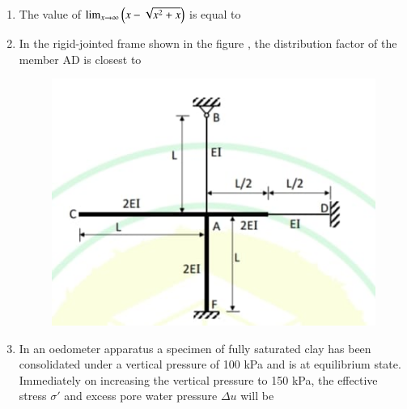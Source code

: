 \documentclass[journal,12pt,onecolumn]{article}
\theoremstyle{remark}
\begin{document}
\begin{enumerate}
\hfill{}

\item The value of $\lim_{x \to \infty} \left(x - \sqrt{x^2+x}\right)$ is equal to

\hfill{}
\begin{enumerate}
\end{enumerate}

\item In the rigid-jointed frame shown in the figure , the distribution factor of the member AD is closest to
\begin{figure}[H]
    \centering
    \includegraphics[width=0.7\columnwidth]{figs/1q-37.jpg}
    \caption{}
    \label{fig:q37}
\end{figure}

\hfill{}
\begin{enumerate}
\end{enumerate}

\item In an oedometer apparatus a specimen of fully saturated clay has been consolidated under a vertical pressure of 100 kPa and is at equilibrium state. Immediately on increasing the vertical pressure to 150 kPa, the effective stress $\sigma'$ and excess pore water pressure $\Delta u$ will be


\end{enumerate}
\end{document}

